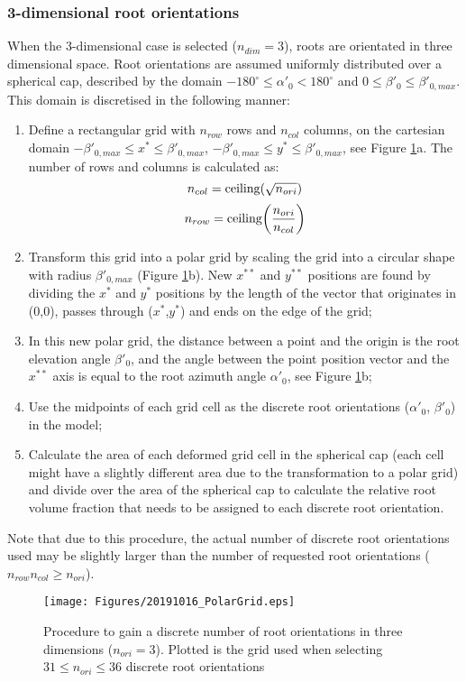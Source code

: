 \documentclass[a4 paper, 11  pt]{article}
\begin{document}
\subsubsection{3-dimensional root orientations}
When the 3-dimensional case is selected ($n_{dim}=3$), roots are orientated in three dimensional space. Root orientations are assumed uniformly distributed over a spherical cap, described by the domain $-180^\circ \leq \alpha'_0 < 180^\circ$ and $0 \leq \beta'_0 \leq \beta'_{0,max}$. This domain is discretised in the following manner:
\begin{enumerate}
	\parskip=1pt
	\itemsep=0pt
	\item Define a rectangular grid with $n_{row}$ rows and $n_{col}$ columns, on the cartesian domain $-\beta'_{0,max} \leq x^* \leq \beta'_{0,max}$, $-\beta'_{0,max} \leq y^* \leq \beta'_{0,max}$, see Figure \ref{fig:polargrid}a. The number of rows and columns is calculated as:
		\begin{equation}
		 n_{col} = \text{ceiling}\qty(\sqrt{n_{ori}})
		\end{equation}
		\begin{equation}
			n_{row} = \text{ceiling}\qty(\frac{n_{ori}}{n_{col}})
		\end{equation}
	\item Transform this grid into a polar grid by scaling the grid into a circular shape with radius $\beta'_{0,max}$ (Figure \ref{fig:polargrid}b). New $x^{**}$ and $y^{**}$ positions are found by dividing the $x^*$ and $y^*$ positions by the length of the vector that originates in (0,0), passes through ($x^*$,$y^*$) and ends on the edge of the grid;
	\item In this new polar grid, the distance between a point and the origin is the root elevation angle $\beta'_{0}$, and the angle between the point position vector and the $x^{**}$ axis is equal to the root azimuth angle $\alpha'_0$, see Figure \ref{fig:polargrid}b;
	\item Use the midpoints of each grid cell as the discrete root orientations ($\alpha'_0$, $\beta'_0$) in the model;
	\item Calculate the area of each deformed grid cell in the spherical cap (each cell might have a slightly different area due to the transformation to a polar grid) and divide over the area of the spherical cap to calculate the relative root volume fraction that needs to be assigned to each discrete root orientation.
\end{enumerate}
Note that due to this procedure, the actual number of discrete root orientations used may be slightly larger than the number of requested root orientations ($n_{row} n_{col} \geq n_{ori}$).
\begin{figure}
	\centering
		\texttt{[image: Figures/20191016\_PolarGrid.eps]}
	\caption{Procedure to gain a discrete number of root orientations in three dimensions ($n_{ori}=3$). Plotted is the grid used when selecting $ 31 \leq n_{ori} \leq 36$ discrete root orientations}
	\label{fig:polargrid}
\end{figure}
\end{document}
